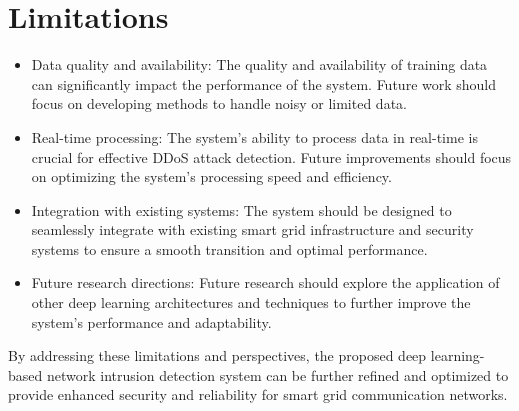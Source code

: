 \section*{Limitations}
\begin{itemize}
    \item Data quality and availability: The quality and availability of training data can significantly impact the performance of the system. Future work should focus on developing methods to handle noisy or limited data.
    \item Real-time processing: The system's ability to process data in real-time is crucial for effective DDoS attack detection. Future improvements should focus on optimizing the system's processing speed and efficiency.
    \item Integration with existing systems: The system should be designed to seamlessly integrate with existing smart grid infrastructure and security systems to ensure a smooth transition and optimal performance.
    \item Future research directions: Future research should explore the application of other deep learning architectures and techniques to further improve the system's performance and adaptability.
\end{itemize}
    
    
    
    



By addressing these limitations and perspectives, the proposed deep learning-based network intrusion detection system can be further refined and optimized to provide enhanced security and reliability for smart grid communication networks.